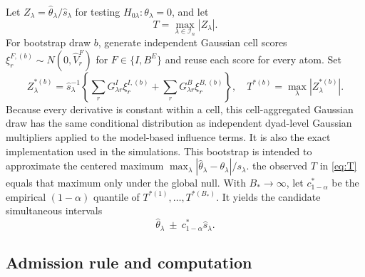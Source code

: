 \documentclass[11pt]{article}
\theoremstyle{definition}
\newcommand{\1}{\mathbf 1}\newcommand{\op}{\operatorname}
\newcommand{\cI}{\mathcal I}\newcommand{\cJ}{\mathcal J}\newcommand{\cF}{\mathcal F}
\begin{document}
Let $Z_\lambda=\widehat\theta_\lambda/\widehat s_\lambda$ for testing $H_{0\lambda}:\theta_\lambda=0$, and let
\begin{equation}
 T=\max_{\lambda\in\cI_n}|Z_\lambda|.                              \label{eq:T}
\end{equation}
For bootstrap draw $b$, generate independent Gaussian cell scores
$\xi_r^{F,(b)}\sim N(0,\widehat V_r^F)$ for $F\in\{I,B^E\}$ and reuse each score
for every atom.  Set
\begin{equation}
 Z_\lambda^{*(b)}=\widehat s_\lambda^{-1}
 \left\{\sum_rG_{\lambda r}^{I}\xi_r^{I,(b)}
 +\sum_rG_{\lambda r}^{B}\xi_r^{B,(b)}\right\},
 \quad T^{*(b)}=\max_\lambda|Z_\lambda^{*(b)}|.                 \label{eq:multiplier}
\end{equation}
Because every derivative is constant within a cell, this cell-aggregated Gaussian
draw has the same conditional distribution as independent dyad-level Gaussian
multipliers applied to the model-based influence terms.  It is also the exact
implementation used in the simulations.
This bootstrap is intended to approximate the centered maximum
$\max_\lambda|\widehat\theta_\lambda-\theta_\lambda|/s_\lambda$.
the observed $T$ in \eqref{eq:T} equals that maximum only under the global null.
With $B_*\to\infty$, let $c_{1-\alpha}^*$ be the empirical
$(1-\alpha)$ quantile of $T^{*(1)},\ldots,T^{*(B_*)}$.  It yields the candidate
simultaneous intervals
\begin{equation}
 \widehat\theta_\lambda\ \pm\ c_{1-\alpha}^*\widehat s_\lambda.    \label{eq:simci}
\end{equation}

\subsection{Admission rule and computation}
\end{document}
